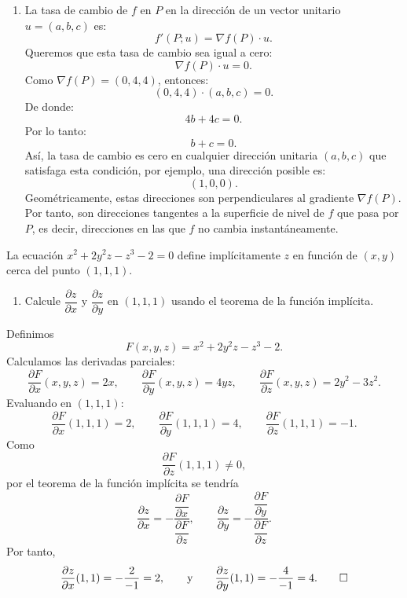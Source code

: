 \documentclass[11pt,respuestas,a4]{aleph-examen}
\begin{document}
\begin{preguntas}
\begin{respuesta}
\begin{enumerate}
    \item La tasa de cambio de \(f\) en \(P\) en la dirección de un vector unitario \(u=(a,b,c)\) es:
    \[
        f'(P; u)
        =
        \nabla f(P)\cdot u.
    \]
    Queremos que esta tasa de cambio sea igual a cero:
    \[
        \nabla f(P)\cdot u
        =
        0.
    \]
    Como \(\nabla f(P)=(0,4,4)\), entonces:
    \[
        (0,4,4)\cdot(a,b,c)
        =
        0.
    \]
    De donde:
    \[
        4b+4c
        =
        0.
    \]
    Por lo tanto:
    \[
        b+c=0.
    \]
    Así, la tasa de cambio es cero en cualquier dirección unitaria \((a,b,c)\) que satisfaga esta condición, por ejemplo, una dirección posible es:
    \[
        (1,0,0).
    \]
    Geométricamente, estas direcciones son perpendiculares al gradiente \(\nabla f(P)\). Por tanto, son direcciones tangentes a la superficie de nivel de \(f\) que pasa por \(P\), es decir, direcciones en las que \(f\) no cambia instantáneamente.\qedhere
\end{enumerate}
\end{respuesta}

\item
La ecuación $x^2+2y^2z-z^3-2=0$ define implícitamente \(z\) en función de \((x,y)\) cerca del punto \((1,1,1)\).
\begin{enumerate}
    \item Calcule \(\dfrac{\partial z}{\partial x}\) y \(\dfrac{\partial z}{\partial y}\) en \((1,1,1)\) usando el teorema de la función implícita.
\end{enumerate}

\begin{respuesta}
Definimos
    \[
        F(x,y,z)
        =
        x^2+2y^2z-z^3-2.
    \]
    Calculamos las derivadas parciales:
    \[
        \frac{\partial F}{\partial x}(x,y,z)
        =
        2x,
        \qquad
        \frac{\partial F}{\partial y}(x,y,z)
        =
        4yz,
        \qquad
        \frac{\partial F}{\partial z}(x,y,z)
        =
        2y^2-3z^2.
    \]
    Evaluando en \((1,1,1)\):
    \[
        \frac{\partial F}{\partial x}(1,1,1)
        =
        2,
        \qquad
        \frac{\partial F}{\partial y}(1,1,1)
        =
        4,
        \qquad
        \frac{\partial F}{\partial z}(1,1,1)
        =
        -1.
    \]
    Como
    \[
        \frac{\partial F}{\partial z}(1,1,1)\neq 0,
    \]
    por el teorema de la función implícita se tendría
    \[
        \frac{\partial z}{\partial x}
        =
        -\frac{\dfrac{\partial F}{\partial x}}{\dfrac{\partial F}{\partial z}},
        \qquad
        \frac{\partial z}{\partial y}
        =
        -\frac{\dfrac{\partial F}{\partial y}}{\dfrac{\partial F}{\partial z}}.
    \]
    Por tanto,
    \[
        \frac{\partial z}{\partial x}(1,1)
        =
        -\frac{2}{-1}
        =
        2,\qquad\text{y}\qquad
        \frac{\partial z}{\partial y}(1,1)
        =
        -\frac{4}{-1}
        =
        4.\qedhere
    \]
\end{respuesta}



\end{preguntas}
\end{document}
